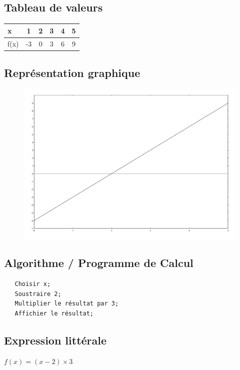 \documentclass[paper=a4, fontsize=9pt]{scrartcl} %
\begin{document}
\begin{multicols}{2}

  \subsection{Tableau de valeurs}

  \begin{center}
    \begin{tabular}{| l || c | c | c | c | c |}
      \hline			
      x    &  1 & 2 & 3 & 4 & 5\\
      \hline  
      f(x) & -3 & 0 & 3 & 6 & 9\\
      \hline  
    \end{tabular}
  \end{center}


  \subsection{Représentation graphique}

  \begin{figure}[H]
    \centering
    \includegraphics[width=0.7\linewidth]{sources/cours/droite.pdf}
  \end{figure}


  \subsection{Algorithme / Programme de Calcul}
  
\begin{verbatim}
   Choisir x;
   Soustraire 2;
   Multiplier le résultat par 3;
   Affichier le résultat; 
\end{verbatim}


\subsection{Expression littérale}

$f(x) = (x - 2) \times 3 $

\end{multicols}
\end{document}
